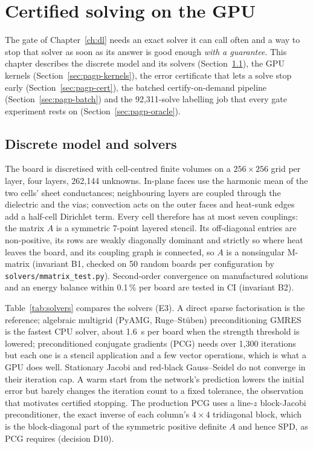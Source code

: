 
\chapter{Certified solving on the GPU}
\label{ch:pagp}

The gate of Chapter~\ref{ch:dl} needs an exact solver it can call often and a way to stop that
solver as soon as its answer is good enough \emph{with a guarantee}. This chapter describes the
discrete model and its solvers (Section~\ref{sec:pagp-model}), the GPU kernels
(Section~\ref{sec:pagp-kernels}), the error certificate that lets a solve stop early
(Section~\ref{sec:pagp-cert}), the batched certify-on-demand pipeline
(Section~\ref{sec:pagp-batch}) and the 92{,}311-solve labelling job that every gate experiment
rests on (Section~\ref{sec:pagp-oracle}).

\section{Discrete model and solvers}
\label{sec:pagp-model}
The board is discretised with cell-centred finite volumes on a $256\times256$ grid per layer,
four layers, 262{,}144 unknowns. In-plane faces use the harmonic mean of the two cells' sheet
conductances; neighbouring layers are coupled through the dielectric and the vias; convection
acts on the outer faces and heat-sunk edges add a half-cell Dirichlet term. Every cell therefore
has at most seven couplings: the matrix $A$ is a symmetric 7-point layered stencil. Its
off-diagonal entries are non-positive, its rows are weakly diagonally dominant and strictly so
where heat leaves the board, and its coupling graph is connected, so $A$ is a nonsingular
M-matrix (invariant B1, checked on 50 random boards per configuration by
\texttt{solvers/mmatrix\_test.py}). Second-order convergence on manufactured solutions and an
energy balance within 0.1\,\% per board are tested in CI (invariant B2).

Table~\ref{tab:solvers} compares the solvers (E3). A direct sparse factorisation is the
reference; algebraic multigrid (PyAMG, Ruge--St\"uben) preconditioning GMRES is the fastest CPU
solver, about 1.6~s per board when the strength threshold is lowered; preconditioned conjugate
gradients (PCG) needs over 1{,}300 iterations but each one is a stencil application and a few
vector operations, which is what a GPU does well. Stationary Jacobi and red-black Gauss--Seidel
do not converge in their iteration cap. A warm start from the network's prediction lowers the
initial error but barely changes the iteration count to a fixed tolerance, the observation that
motivates certified stopping. The production PCG uses a line-$z$ block-Jacobi preconditioner,
the exact inverse of each column's $4\times4$ tridiagonal block, which is the block-diagonal part
of the symmetric positive definite $A$ and hence SPD, as PCG requires (decision D10).

